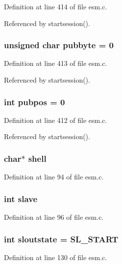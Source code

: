 Definition at line 414 of file esm.c.

Referenced by startsession().
\subsubsection{\setlength{\rightskip}{0pt plus 5cm}unsigned char {\bf pubbyte} = 0}\label{esm_8c_a45}




Definition at line 413 of file esm.c.

Referenced by startsession().
\subsubsection{\setlength{\rightskip}{0pt plus 5cm}int {\bf pubpos} = 0}\label{esm_8c_a44}




Definition at line 412 of file esm.c.

Referenced by startsession().
\subsubsection{\setlength{\rightskip}{0pt plus 5cm}char$\ast$ {\bf shell}}\label{esm_8c_a23}




Definition at line 94 of file esm.c.
\subsubsection{\setlength{\rightskip}{0pt plus 5cm}int {\bf slave}}\label{esm_8c_a25}




Definition at line 96 of file esm.c.
\subsubsection{\setlength{\rightskip}{0pt plus 5cm}int {\bf sloutstate} = SL\_\-START}\label{esm_8c_a39}




Definition at line 130 of file esm.c.
